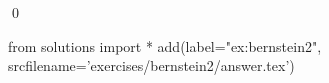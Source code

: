 
\begin{ex} 
  \label{ex:bernstein2}
  
  \qed
\end{ex} 
\begin{python0}
from solutions import *
add(label="ex:bernstein2",
    srcfilename='exercises/bernstein2/answer.tex') 
\end{python0}
